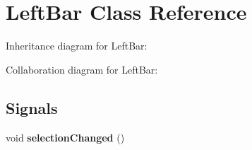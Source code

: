 \hypertarget{classLeftBar}{}\section{Left\+Bar Class Reference}
\label{classLeftBar}


Inheritance diagram for Left\+Bar\+:


Collaboration diagram for Left\+Bar\+:
\subsection*{Signals}
\begin{DoxyCompactItemize}
\item 
void {\bfseries selection\+Changed} ()\hypertarget{classLeftBar_a275ebb41e43eb2592fa245e5b366c727}{}\label{classLeftBar_a275ebb41e43eb2592fa245e5b366c727}

\end{DoxyCompactItemize}
